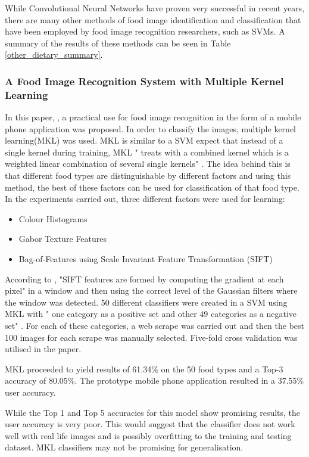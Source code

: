 While Convolutional Neural Networks have proven very successful in recent years, there are many other methods of food image identification and classification that have been employed by food image recognition researchers, such as SVMs.
A summary of the results of these methods can be seen in Table \ref{other_dietary_summary}.

\subsubsection*{A Food Image Recognition System with Multiple Kernel Learning}
In this paper, \parencite{kernelLearning}, a practical use for food image recognition in the form of a mobile phone application was proposed.
In order to classify the images, multiple kernel learning(MKL) was used.
MKL is similar to a SVM expect that instead of a single kernel during training, MKL " treats with a combined kernel which is a weighted linear combination of several single kernels" \parencite{kernelLearning}.
The idea behind this is that different food types are distinguishable by different factors and using this method, the best of these factors can be used for classification of that food type.
In the experiments carried out, three different factors were used for learning:
\begin{itemize}
	\item{Colour Histograms}
	\item{Gabor Texture Features}
	\item{Bag-of-Features using Scale Invariant Feature Transformation (SIFT)}
\end{itemize}

According to \parencite{sift}, "SIFT features are formed by computing the gradient at each pixel" in a window and then using the correct level of the Gaussian filters where the window was detected.
50 different classifiers were created in a SVM using MKL with " one category as a positive set and other 49 categories as a negative set" \parencite{kernelLearning}.
For each of these categories, a web scrape was carried out and then the best 100 images for each scrape was manually selected. Five-fold cross validation was utilised in the paper.

MKL proceeded to yield results of 61.34\% on the 50 food types and a Top-3 accuracy of 80.05\%.
The prototype mobile phone application resulted in a 37.55\% user accuracy.

While the Top 1 and Top 5 accuracies for this model show promising results, the user accuracy is very poor.
This would suggest that the classifier does not work well with real life images and is possibly overfitting to the training and testing dataset.
MKL classifiers may not be promising for generalisation.


